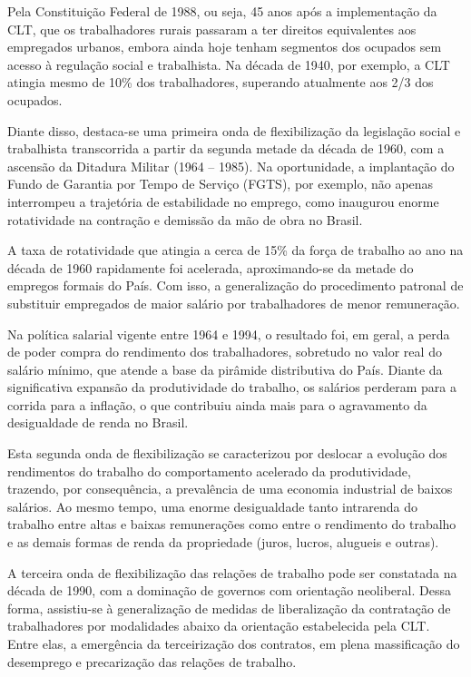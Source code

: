 Pela Constituição Federal de 1988, ou seja, 45 anos após a implementação
da CLT, que os trabalhadores rurais passaram a ter direitos equivalentes
aos empregados urbanos, embora ainda hoje tenham segmentos dos ocupados
sem acesso à regulação social e trabalhista. Na década de 1940, por
exemplo, a CLT atingia mesmo de 10\% dos trabalhadores, superando
atualmente aos 2/3 dos ocupados.

Diante disso, destaca-se uma primeira onda de flexibilização da
legislação social e trabalhista transcorrida a partir da segunda metade
da década de 1960, com a ascensão da Ditadura Militar (1964 -- 1985). Na
oportunidade, a implantação do Fundo de Garantia por Tempo de Serviço
(FGTS), por exemplo, não apenas interrompeu a trajetória de estabilidade
no emprego, como inaugurou enorme rotatividade na contração e demissão
da mão de obra no Brasil.

A taxa de rotatividade que atingia a cerca de 15\% da força de trabalho
ao ano na década de 1960 rapidamente foi acelerada, aproximando-se da
metade do empregos formais do País. Com isso, a generalização do
procedimento patronal de substituir empregados de maior salário por
trabalhadores de menor remuneração.

Na política salarial vigente entre 1964 e 1994, o resultado foi, em
geral, a perda de poder compra do rendimento dos trabalhadores,
sobretudo no valor real do salário mínimo, que atende a base da pirâmide
distributiva do País. Diante da significativa expansão da produtividade
do trabalho, os salários perderam para a corrida para a inflação, o que
contribuiu ainda mais para o agravamento da desigualdade de renda no
Brasil.

Esta segunda onda de flexibilização se caracterizou por deslocar a
evolução dos rendimentos do trabalho do comportamento acelerado da
produtividade, trazendo, por consequência, a prevalência de uma economia
industrial de baixos salários. Ao mesmo tempo, uma enorme desigualdade
tanto intrarenda do trabalho entre altas e baixas remunerações como
entre o rendimento do trabalho e as demais formas de renda da
propriedade (juros, lucros, alugueis e outras).

A terceira onda de flexibilização das relações de trabalho pode ser
constatada na década de 1990, com a dominação de governos com orientação
neoliberal. Dessa forma, assistiu-se à generalização de medidas de
liberalização da contratação de trabalhadores por modalidades abaixo da
orientação estabelecida pela CLT. Entre elas, a emergência da
terceirização dos contratos, em plena massificação do desemprego e
precarização das relações de trabalho.

